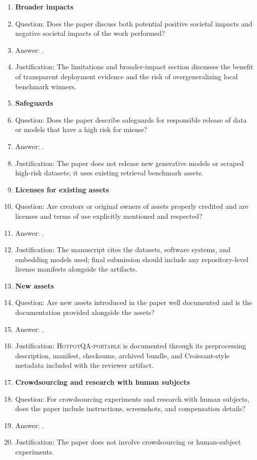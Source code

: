 \begin{enumerate}
\item {\bf Broader impacts}
    \item[] Question: Does the paper discuss both potential positive societal impacts and negative societal impacts of the work performed?
    \item[] Answer: \answerYes{}.
    \item[] Justification: The limitations and broader-impact section discusses the benefit of transparent deployment evidence and the risk of overgeneralizing local benchmark winners.

\item {\bf Safeguards}
    \item[] Question: Does the paper describe safeguards for responsible release of data or models that have a high risk for misuse?
    \item[] Answer: \answerNA{}.
    \item[] Justification: The paper does not release new generative models or scraped high-risk datasets; it uses existing retrieval benchmark assets.

\item {\bf Licenses for existing assets}
    \item[] Question: Are creators or original owners of assets properly credited and are licenses and terms of use explicitly mentioned and respected?
    \item[] Answer: \answerYes{}.
    \item[] Justification: The manuscript cites the datasets, software systems, and embedding models used; final submission should include any repository-level license manifests alongside the artifacts.

\item {\bf New assets}
    \item[] Question: Are new assets introduced in the paper well documented and is the documentation provided alongside the assets?
    \item[] Answer: \answerYes{}.
    \item[] Justification: \textsc{HotpotQA-portable} is documented through its preprocessing description, manifest, checksums, archived bundle, and Croissant-style metadata included with the reviewer artifact.

\item {\bf Crowdsourcing and research with human subjects}
    \item[] Question: For crowdsourcing experiments and research with human subjects, does the paper include instructions, screenshots, and compensation details?
    \item[] Answer: \answerNA{}.
    \item[] Justification: The paper does not involve crowdsourcing or human-subject experiments.


\end{enumerate}
